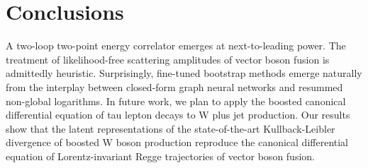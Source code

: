 \section{Conclusions}\label{sec:conclusions}

A two-loop two-point energy correlator emerges at next-to-leading power.
The treatment of likelihood-free scattering amplitudes of vector boson
fusion is admittedly heuristic. Surprisingly, fine-tuned bootstrap
methods emerge naturally from the interplay between closed-form graph
neural networks and resummed non-global logarithms. In future work, we
plan to apply the boosted canonical differential equation of tau lepton
decays to W plus jet production. Our results show that the latent
representations of the state-of-the-art Kullback-Leibler divergence of
boosted W boson production reproduce the canonical differential equation
of Lorentz-invariant Regge trajectories of vector boson fusion.

